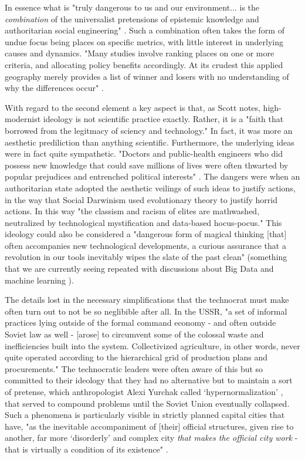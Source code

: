 In essence what is "truly dangerous to us and our environment... is the \textit{combination} of the universalist pretensions of epistemic knowledge and authoritarian social engineering" \cite{scottSeeingStateHow2020}. Such a combination often takes the form of undue focus being places on specific metrics, with little interest in underlying causes and dynamics. "Many studies involve ranking places on one or more criteria, and allocating policy benefits accordingly. At its crudest this applied geography merely provides a list of winner and losers with no understanding of why the differences occur" \cite{taylorGeographicInformationSystems1994}.

With regard to the second element a key aspect is that, as Scott notes, high-modernist ideology is not scientific practice exactly. Rather, it is a "faith that borrowed from the legitmacy of sciency and technology." In fact, it was more an aesthetic prediliction than anything scientific. Furthermore, the underlying ideas were in fact quite sympathetic. "Doctors and public-health engineers who did possess new knowledge that could save millions of lives were often thwarted by popular prejudices and entrenched political interests"  \cite{scottSeeingStateHow2020}. The dangers were when an authoritarian state adopted the aesthetic veilings of such ideas to justify actions, in the way that Social Darwinism used evolutionary theory to justify horrid actions. In this way "the classism and racism of elites are mathwashed, neutralized by technological mystification and data-based hocus-pocus." \cite{eubanksAutomatingInequalityHow2018} This ideology could also be considered a "dangerous form of magical thinking [that] often accompanies new technological developments, a curious assurance that a revolution in our tools inevitably wipes the slate of the past clean" \cite{eubanksAutomatingInequalityHow2018} (something that we are currently seeing repeated with discussions about Big Data and machine learning \cite{barnesBigDataSocial2014}).

The details lost in the necessary simplifications that the technocrat must make often turn out to not be so neglibible after all. In the USSR, "a set of informal practices lying outside of the formal command economy - and often outside Soviet law as well - [arose] to circumvent some of the colossal waste and inefficiencies built into the system. Collectivized agriculture, in other words, never quite operated according to the hierarchical grid of production plans and procurements." \cite{scottSeeingStateHow2020} The technocratic leaders were often aware of this but so committed to their ideology that they had no alternative but to maintain a sort of pretense, which anthropologist Alexi Yurchak called `hypernormalization' \cite{yurchakEverythingWasForever2005}, that served to compound problems until the Soviet Union eventually collapsed. Such a phenomena is particularly visible in strictly planned capital cities that have, "as the inevitable accompaniment of [their] official structures, given rise to another, far more `disorderly' and complex city \textit{that makes the official city work} - that is virtually a condition of its existence" \cite{scottSeeingStateHow2020}.

